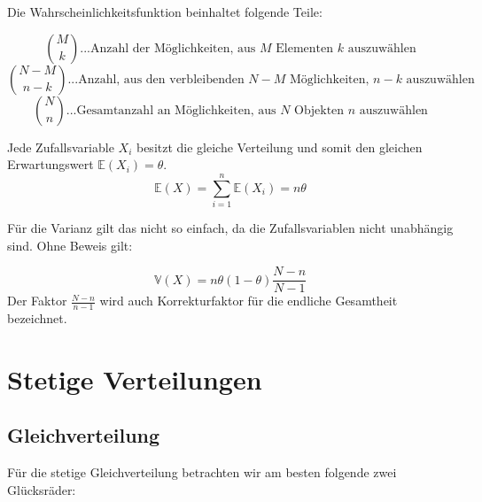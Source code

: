 {    Die Wahrscheinlichkeitsfunktion beinhaltet folgende Teile:

    \[\binom{M}{k}...\text{Anzahl der Möglichkeiten, aus $M$ Elementen $k$ auszuwählen}\]
    \[\binom{N-M}{n-k}...\text{Anzahl, aus den verbleibenden $N-M$ Möglichkeiten, $n-k$ auszuwählen}\]
    \[\binom{N}{n}...\text{Gesamtanzahl an Möglichkeiten, aus $N$ Objekten $n$ auszuwählen}\]

    Jede Zufallsvariable $X_{i}$ besitzt die gleiche Verteilung und somit den gleichen Erwartungswert
    $\mathbb E\left(X_{i}\right)=\theta$.
    \[\mathbb{E}\left(X\right)=\sum_{i=1}^{n}{\mathbb E\left(X_{i}\right)}=n\theta\]

    Für die Varianz gilt das nicht so einfach, da die Zufallsvariablen nicht
    unabhängig sind. Ohne Beweis gilt:

    \[\mathbb V\left(X\right)=n\theta \left(1-\theta \right)\frac{N-n}{N-1}\]
    Der Faktor $\frac{N-n}{n-1}$ wird auch Korrekturfaktor für die endliche Gesamtheit bezeichnet.
    
    

    \section{Stetige Verteilungen}
    \label{sec:stetige_verteilungen}

    \subsection{Gleichverteilung}

    \begin{bsp}
    Für die stetige Gleichverteilung betrachten wir am besten folgende zwei
    Glücksräder:

    \begin{center}
    {
        \def\num{8}
        \def\size{1.5}
        }
\end{center}
\end{bsp}}
